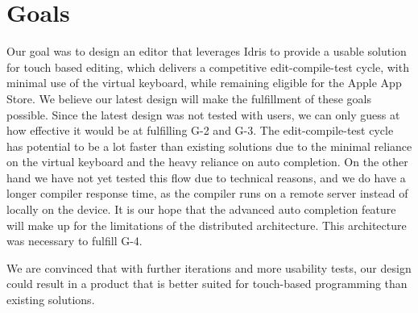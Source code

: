 \section{Goals}
Our goal was to design an editor that leverages Idris to provide a usable solution for touch based editing, which delivers a competitive edit-compile-test cycle, with minimal use of the virtual keyboard, while remaining eligible for the Apple App Store.
We believe our latest design will make the fulfillment of these goals possible. 
Since the latest design was not tested with users, we can only guess at how effective
it would be at fulfilling G-2 and G-3. The edit-compile-test cycle has potential to be a lot faster than existing solutions due to the minimal reliance
on the virtual keyboard and the heavy reliance on auto completion. On the other
hand we have not yet tested this flow due to technical reasons, and we do have
a longer compiler response time, as the compiler runs on a remote server
instead of locally on the device. It is our hope that the advanced auto
completion feature will make up for the limitations of the distributed
architecture. This architecture was necessary to fulfill G-4.

We are convinced that with further iterations and more usability tests, our design could result in a product that is better suited for touch-based programming than existing
solutions. 

